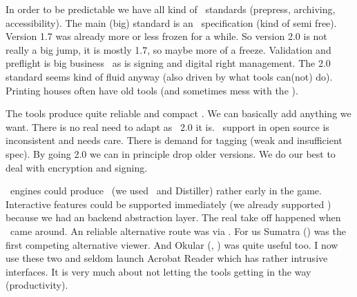 \stoptitle

\starttitle[title=Standardization]

\startitemize
\startitem In order to be predictable we have all kind of \PDF\ standards (prepress, archiving, accessibility). \stopitem
\startitem The main (big) standard is an \ISO\ specification (kind of semi free). \stopitem
\startitem Version 1.7 was already more or less frozen for a while. \stopitem
\startitem So version 2.0 is not really a big jump, it is mostly 1.7, so maybe more of a freeze. \stopitem
\startitem Validation and preflight is big business \unknown \stopitem
\startitem \unknown\ as is signing and digital right management. \stopitem
\startitem The 2.0 standard seems kind of fluid anyway (also driven by what tools can(not) do). \stopitem
\startitem Printing houses often have old tools (and sometimes mess with the \PDF). \stopitem
\stopitemize

\stoptitle

\starttitle[title=Producing \PDF]

\startitemize
\startitem The tools produce quite reliable and compact \PDF. \stopitem
\startitem We can basically add anything we want. \stopitem
\startitem There is no real need to adapt as \PDF\ 2.0 it is. \stopitem
\startitem \TYPETHREE\ support in open source is inconsistent and needs care. \stopitem
\startitem There is demand for tagging (weak and insufficient spec). \stopitem
\startitem By going 2.0 we can in principle drop older versions. \stopitem
\startitem We do our best to deal with encryption and signing. \stopitem
\stopitemize

\stoptitle

\starttitle[title=Open source]

\startitemize
\startitem \TEX\ engines could produce \PDF\ (we used \DVIPSONE\ and Distiller) rather early in the game. \stopitem
\startitem Interactive features could be supported immediately (we already supported \DVIWINDO) because we had an backend abstraction layer. \stopitem
\startitem The real take off happened when \PDFTEX\ came around. \stopitem
\startitem An reliable alternative route was via \DVIPDFMX. \stopitem
\startitem For us Sumatra (\MSWINDOWS) was the first competing alternative viewer. \stopitem
\startitem And Okular (\LINUX, \MSWINDOWS) was quite useful too. \stopitem
\startitem I now use these two and seldom launch Acrobat Reader which has rather intrusive interfaces. \stopitem
\startitem It is very much about not letting the tools getting in the way (productivity). \stopitem
\stopitemize


